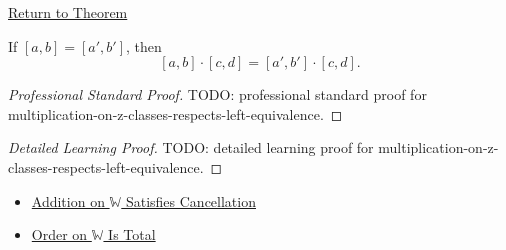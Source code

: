 \newpage
{}
\label{prf:multiplication-on-z-classes-respects-left-equivalence}

\begin{remark*}[Return]
\hyperref[lem:multiplication-on-z-classes-respects-left-equivalence]{Return to Theorem}
\end{remark*}

\begin{lemma*}
If $[a,b]=[a',b']$, then
\[
[a,b]\cdot[c,d]=[a',b']\cdot[c,d].
\]
\end{lemma*}

\begin{proof}[Professional Standard Proof]
\LRAProofBodyStart
TODO: professional standard proof for multiplication-on-z-classes-respects-left-equivalence.
\end{proof}

\begin{proof}[Detailed Learning Proof]
\LRAProofBodyStart
TODO: detailed learning proof for multiplication-on-z-classes-respects-left-equivalence.
\end{proof}

\begin{remark*}
\end{remark*}

\begin{dependencies}
\begin{itemize}
  \item \hyperref[thm:addition-on-w-cancellation]{Addition on $\mathbb{W}$ Satisfies Cancellation}
  \item \hyperref[thm:order-on-w-total]{Order on $\mathbb{W}$ Is Total}
\end{itemize}
\end{dependencies}

\clearpage
